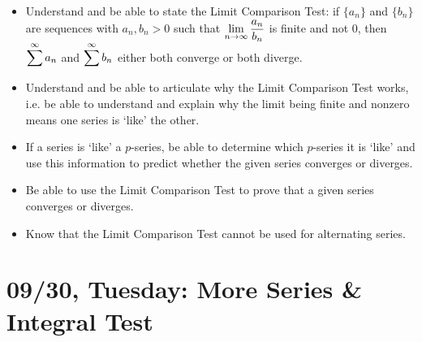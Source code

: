 \documentclass[11pt,letterpaper]{article}
\begin{document}
\begin{itemize}
\item Understand and be able to state the Limit Comparison Test: if $\{ a_n \}$ and $\{ b_n \}$ are sequences with $a_n, b_n > 0$ such that $\displaystyle\lim_{n \to \infty} \dfrac{a_n}{b_n}$ is finite and not 0, then $\displaystyle\sum^\infty a_n$ and $\displaystyle\sum^\infty b_n$ either both converge or both diverge. 

\item Understand and be able to articulate why the Limit Comparison Test works, i.e. be able to understand and explain why the limit being finite and nonzero means one series is `like' the other. 

\item If a series is `like' a $p$-series, be able to determine which $p$-series it is `like' and use this information to predict whether the given series converges or diverges.

\item Be able to use the Limit Comparison Test to prove that a given series converges or diverges. 

\item Know that the Limit Comparison Test cannot be used for alternating series. 
\end{itemize}

\newpage
\section*{09/30, Tuesday: More Series \& Integral Test\label{09-30}}
\end{document}
